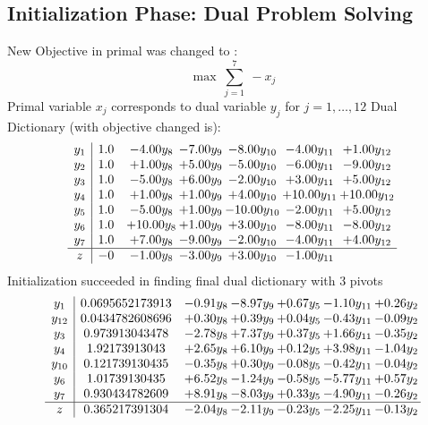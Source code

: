\documentclass[8pt]{article}
\begin{document}
\subsection{Initialization Phase: Dual Problem Solving}
New Objective in primal was changed to : \[ \max\ \sum_{j=1}^{7}\ - x_j \] 
Primal variable $x_j$ corresponds to dual variable $y_j$ for $j = 1,\ldots,12$
Dual Dictionary (with objective changed is): 
\[\begin{array}{c| c c@{\hskip 2pt} c@{\hskip 2pt} c@{\hskip 2pt} c@{\hskip 2pt} c@{\hskip 2pt} }
 y_{1}   &  1.0 & -4.00 y_{8} & -7.00 y_{9} & -8.00 y_{10} & -4.00 y_{11} & +  1.00 y_{12}\\
 y_{2}   &  1.0 & +  1.00 y_{8} & +  5.00 y_{9} & -5.00 y_{10} & -6.00 y_{11} & -9.00 y_{12}\\
 y_{3}   &  1.0 & -5.00 y_{8} & +  6.00 y_{9} & -2.00 y_{10} & +  3.00 y_{11} & +  5.00 y_{12}\\
 y_{4}   &  1.0 & +  1.00 y_{8} & +  1.00 y_{9} & +  4.00 y_{10} & + 10.00 y_{11} & + 10.00 y_{12}\\
 y_{5}   &  1.0 & -5.00 y_{8} & +  1.00 y_{9} & -10.00 y_{10} & -2.00 y_{11} & +  5.00 y_{12}\\
 y_{6}   &  1.0 & + 10.00 y_{8} & +  1.00 y_{9} & +  3.00 y_{10} & -8.00 y_{11} & -8.00 y_{12}\\
 y_{7}   &  1.0 & +  7.00 y_{8} & -9.00 y_{9} & -2.00 y_{10} & -4.00 y_{11} & +  4.00 y_{12}\\
\hline
z    &  -0 & -1.00 y_{8} & -3.00 y_{9} & +  3.00 y_{10} & -1.00 y_{11} &   \\
\end{array}\]
Initialization succeeded in finding final dual dictionary with 3 pivots
\[\begin{array}{c| c c@{\hskip 2pt} c@{\hskip 2pt} c@{\hskip 2pt} c@{\hskip 2pt} c@{\hskip 2pt} }
 y_{1}   &  0.0695652173913 & -0.91 y_{8} & -8.97 y_{9} & +  0.67 y_{5} & -1.10 y_{11} & +  0.26 y_{2}\\
 y_{12}   &  0.0434782608696 & +  0.30 y_{8} & +  0.39 y_{9} & +  0.04 y_{5} & -0.43 y_{11} & -0.09 y_{2}\\
 y_{3}   &  0.973913043478 & -2.78 y_{8} & +  7.37 y_{9} & +  0.37 y_{5} & +  1.66 y_{11} & -0.35 y_{2}\\
 y_{4}   &  1.92173913043 & +  2.65 y_{8} & +  6.10 y_{9} & +  0.12 y_{5} & +  3.98 y_{11} & -1.04 y_{2}\\
 y_{10}   &  0.121739130435 & -0.35 y_{8} & +  0.30 y_{9} & -0.08 y_{5} & -0.42 y_{11} & -0.04 y_{2}\\
 y_{6}   &  1.01739130435 & +  6.52 y_{8} & -1.24 y_{9} & -0.58 y_{5} & -5.77 y_{11} & +  0.57 y_{2}\\
 y_{7}   &  0.930434782609 & +  8.91 y_{8} & -8.03 y_{9} & +  0.33 y_{5} & -4.90 y_{11} & -0.26 y_{2}\\
\hline
z    &  0.365217391304 & -2.04 y_{8} & -2.11 y_{9} & -0.23 y_{5} & -2.25 y_{11} & -0.13 y_{2}\\
\end{array}\]
\end{document}
